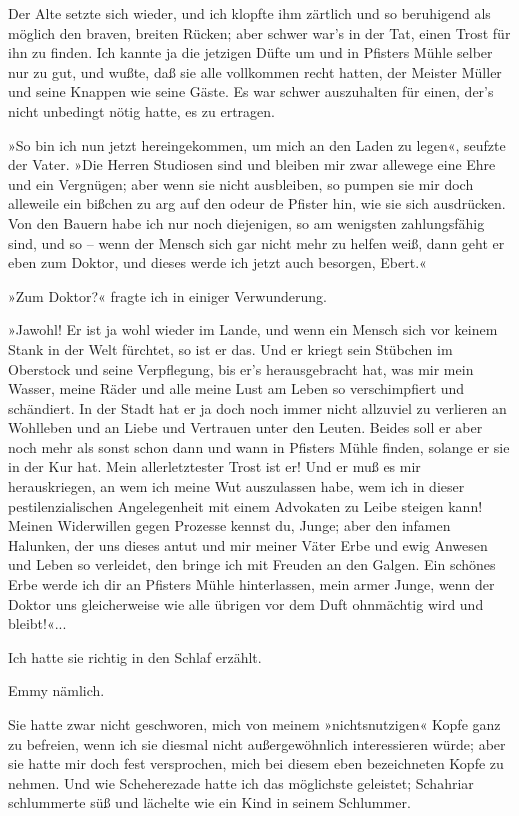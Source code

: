 Der Alte setzte sich wieder, und ich klopfte ihm zärtlich und so
beruhigend als möglich den braven, breiten Rücken; aber schwer
war's in der Tat, einen Trost für ihn zu finden. Ich kannte ja die
jetzigen Düfte um und in Pfisters Mühle selber nur zu gut, und
wußte, daß sie alle vollkommen recht hatten, der Meister Müller und
seine Knappen wie seine Gäste. Es war schwer auszuhalten für einen,
der's nicht unbedingt nötig hatte, es zu ertragen.

»So bin ich nun jetzt hereingekommen, um mich an den Laden zu
legen«, seufzte der Vater. »Die Herren Studiosen sind und bleiben
mir zwar allewege eine Ehre und ein Vergnügen; aber wenn sie nicht
ausbleiben, so pumpen sie mir doch alleweile ein bißchen zu arg auf
den odeur de Pfister hin, wie sie sich ausdrücken. Von den Bauern
habe ich nur noch diejenigen, so am wenigsten zahlungsfähig sind,
und so – wenn der Mensch sich gar nicht mehr zu helfen weiß, dann
geht er eben zum Doktor, und dieses werde ich jetzt auch besorgen,
Ebert.«

»Zum Doktor?« fragte ich in einiger Verwunderung.

»Jawohl! Er ist ja wohl wieder im Lande, und wenn ein Mensch sich
vor keinem Stank in der Welt fürchtet, so ist er das. Und er kriegt
sein Stübchen im Oberstock und seine Verpflegung, bis er's
herausgebracht hat, was mir mein Wasser, meine Räder und alle meine
Lust am Leben so verschimpfiert und schändiert. In der Stadt hat er
ja doch noch immer nicht allzuviel zu verlieren an Wohlleben und an
Liebe und Vertrauen unter den Leuten. Beides soll er aber noch mehr
als sonst schon dann und wann in Pfisters Mühle finden, solange er
sie in der Kur hat. Mein allerletztester Trost ist er! Und er muß
es mir herauskriegen, an wem ich meine Wut auszulassen habe, wem
ich in dieser pestilenzialischen Angelegenheit mit einem Advokaten
zu Leibe steigen kann! Meinen Widerwillen gegen Prozesse kennst du,
Junge; aber den infamen Halunken, der uns dieses antut und mir
meiner Väter Erbe und ewig Anwesen und Leben so verleidet, den
bringe ich mit Freuden an den Galgen. Ein schönes Erbe werde ich
dir an Pfisters Mühle hinterlassen, mein armer Junge, wenn der
Doktor uns gleicherweise wie alle übrigen vor dem Duft ohnmächtig
wird und bleibt!«...

Ich hatte sie richtig in den Schlaf erzählt.

Emmy nämlich.

Sie hatte zwar nicht geschworen, mich von meinem »nichtsnutzigen«
Kopfe ganz zu befreien, wenn ich sie diesmal nicht außergewöhnlich
interessieren würde; aber sie hatte mir doch fest versprochen, mich
bei diesem eben bezeichneten Kopfe zu nehmen. Und wie Scheherezade
hatte ich das möglichste geleistet; Schahriar schlummerte süß und
lächelte wie ein Kind in seinem Schlummer.

